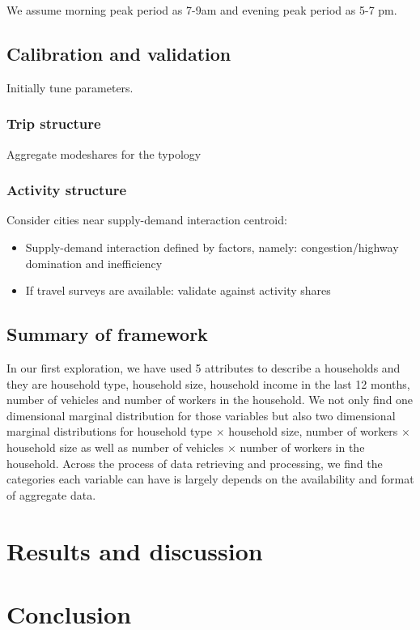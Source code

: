 \documentclass[11pt,twoside]{article}
\numberwithin{equation}{section}
\newcommand{\?}{\stackrel{?}{=}}
\begin{document}
We assume morning peak period as 7-9am and evening peak period as 5-7 pm.


\subsection{Calibration and validation}
Initially tune parameters. 
  
\subsubsection{Trip structure}
Aggregate modeshares for the typology
  
\subsubsection{Activity structure}
Consider cities near supply-demand interaction centroid:
\begin{itemize}
\item Supply-demand interaction defined by factors, namely: congestion/highway domination and inefficiency
\item If travel surveys are available: validate against activity shares
\end{itemize}


\subsection{Summary of framework}
In our first exploration, we have used 5 attributes to describe a households and they are household type, household size, household income in the last 12 months, number of vehicles and number of workers in the household. We not only find one dimensional marginal distribution for those variables but also two dimensional marginal distributions for household type $\times$ household size, number of workers $\times$ household size as well as number of vehicles $\times$ number of workers in the household. Across the process of data retrieving and processing, we find the categories each variable can have is largely depends on the availability and format of aggregate data.




\section{Results and discussion}




\section{Conclusion}
\end{document}
